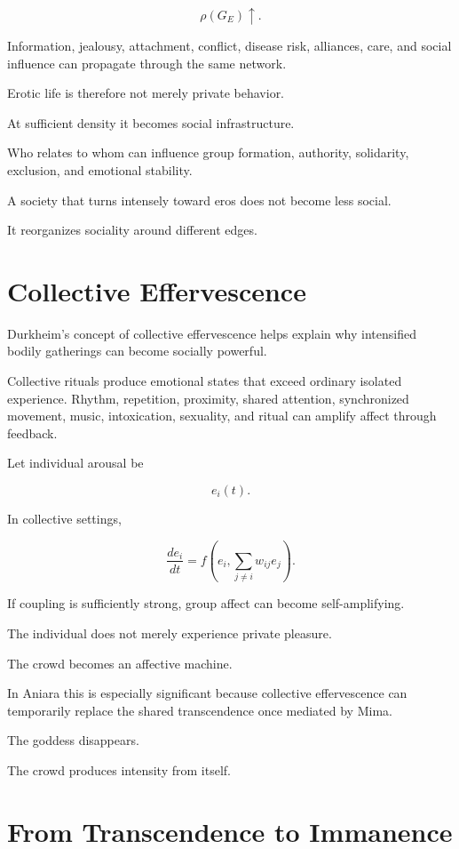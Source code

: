 \documentclass[11pt,oneside]{book}
\theoremstyle{definition}
\theoremstyle{remark}
\begin{document}
\[
\rho(G_E)\uparrow.
\]

Information, jealousy, attachment, conflict, disease risk, alliances, care, and social influence can propagate through the same network.

Erotic life is therefore not merely private behavior.

At sufficient density it becomes social infrastructure.

Who relates to whom can influence group formation, authority, solidarity, exclusion, and emotional stability.

A society that turns intensely toward eros does not become less social.

It reorganizes sociality around different edges.

\section{Collective Effervescence}

Durkheim's concept of collective effervescence helps explain why intensified bodily gatherings can become socially powerful.

Collective rituals produce emotional states that exceed ordinary isolated experience. Rhythm, repetition, proximity, shared attention, synchronized movement, music, intoxication, sexuality, and ritual can amplify affect through feedback.

Let individual arousal be

\[
e_i(t).
\]

In collective settings,

\[
\frac{de_i}{dt}
=
f(
e_i,
\sum_{j\neq i}w_{ij}e_j
).
\]

If coupling is sufficiently strong, group affect can become self-amplifying.

The individual does not merely experience private pleasure.

The crowd becomes an affective machine.

In Aniara this is especially significant because collective effervescence can temporarily replace the shared transcendence once mediated by Mima.

The goddess disappears.

The crowd produces intensity from itself.

\section{From Transcendence to Immanence}
\end{document}
